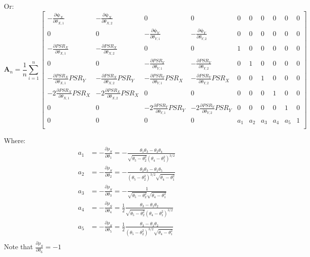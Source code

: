 \documentclass[]{article}
\begin{document}
Or:
\[
\pmb{A}_n = \frac{1}{n} \sum_{i = 1}^{n} \begin{bmatrix}
   -\frac{\partial \pmb{\psi}_X}{\partial \theta_{X, 1}}    &  -\frac{\partial \pmb{\psi}_X}{\partial \theta_{X, 2}}    &   0   &   0   &     0     &     0    &    0    &    0    &    0    &   0 \\
    0   &   0   &   -\frac{\partial \pmb{\psi}_Y}{\partial \theta_{Y, 1}} &   -\frac{\partial \pmb{\psi}_Y}{\partial \theta_{Y,2}}      &     0     &     0    &    0    &    0    &    0    &   0  \\
    -\frac{\partial PSR_X}{\partial \theta_{X,1}}   &  -\frac{\partial PSR_X}{\partial \theta_{X,2}}   & 0   &   0   &   1   &   0  & 0 & 0 & 0 & 0\\
    0 & 0 &    -\frac{\partial PSR_Y}{\partial \theta_{Y,1}}   &  -\frac{\partial PSR_Y}{\partial \theta_{Y,2}}   & 0 & 1 & 0 & 0 & 0 & 0 \\
     -\frac{\partial PSR_X}{\partial \theta_{X,1}} PSR_Y  &  -\frac{\partial PSR_X}{\partial \theta_{X,2}}PSR_Y & -\frac{\partial PSR_Y}{\partial \theta_{Y,1}} PSR_X  &  -\frac{\partial PSR_Y}{\partial \theta_{Y,2}}PSR_X & 0 & 0 &  1 & 0 & 0 & 0 \\
    -2\frac{\partial PSR_X}{\partial \theta_{X,1}} PSR_X  &  -2\frac{\partial PSR_X}{\partial \theta_{X,2}}PSR_X & 0 & 0 & 0 & 0 &  0 & 1 & 0 & 0 \\
    0 & 0 & -2\frac{\partial PSR_Y}{\partial \theta_{Y,1}}PSR_Y  &  -2\frac{\partial PSR_Y}{\partial \theta_{Y,2}}PSR_Y & 0 & 0 &  0 & 0 & 1 & 0 \\
    0 & 0 & 0 & 0 & a_1 & a_2 &  a_3 & a_4 & a_5 & 1 \\
\end{bmatrix}
\]

Where:
  $$
  \begin{aligned}
    a_1 &= -\frac{\partial \rho_S}{\partial \theta_1} = -\frac{\theta_1\theta_3 - \theta_2\theta_4}{\sqrt{\theta_5 - \theta_2^2}(\theta_4 - \theta_1^2)^{3/2}}\\
    a_2 &= -\frac{\partial \rho_S}{\partial \theta_2} = -\frac{\theta_2\theta_3 - \theta_1\theta_5}{(\theta_5 - \theta_2^2)^{3/2} \sqrt{\theta_4 - \theta_1^2}}\\
    a_3 &= -\frac{\partial \rho_S}{\partial \theta_3} = -\frac{1}{\sqrt{\theta_5 - \theta_2^2}\sqrt{\theta_4 - \theta_1^2}}\\
    a_4 &= -\frac{\partial \rho_S}{\partial \theta_4} = \frac{1}{2}\frac{\theta_3 - \theta_1\theta_2}{\sqrt{\theta_5 - \theta_2^2}(\theta_4 - \theta_1^2)^{3/2}}\\
    a_5 &= -\frac{\partial \rho_S}{\partial \theta_5} = \frac{1}{2}\frac{\theta_3 - \theta_1\theta_2}{(\theta_5 - \theta_2^2)^{3/2} \sqrt{\theta_4 - \theta_1^2}}\\
   \end{aligned}
  $$
Note that $\frac{\partial \rho_S}{\partial \theta_6} = -1$
\end{document}
